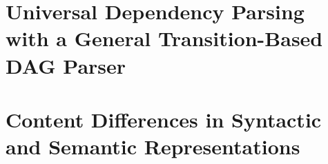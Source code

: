 \documentclass[12pt]{report}
\begin{document}


\chapter{Universal Dependency Parsing with a General Transition-Based DAG Parser}



\chapter{Content Differences in Syntactic and Semantic Representations}






\end{document}
